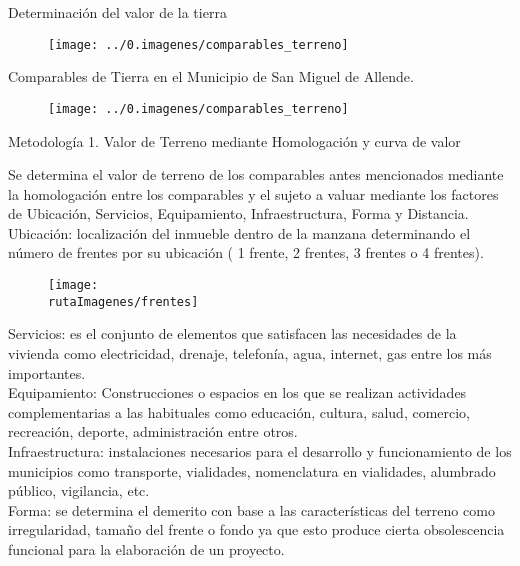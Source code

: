 \textcolor{principal}{Determinaci\'on del valor de la tierra}

\begin{figure}[H]
	\texttt{[image: ../0.imagenes/comparables\_terreno]}
\end{figure}

\textcolor{principal}{Comparables de Tierra en el Municipio de San Miguel de Allende.}

\begin{figure}[H]
	\texttt{[image: ../0.imagenes/comparables\_terreno]}
\end{figure}

\textcolor{principal}{Metodolog\'ia 1. Valor de Terreno mediante Homologaci\'on y curva de valor}

Se determina el valor de terreno de los comparables antes mencionados mediante la homologaci\'on entre los comparables y el sujeto a valuar mediante los factores de Ubicaci\'on, Servicios, Equipamiento, Infraestructura, Forma y Distancia.\\

Ubicaci\'on: localizaci\'on del inmueble dentro de la manzana determinando el n\'umero de frentes por su ubicaci\'on ( 1 frente, 2 frentes, 3 frentes o 4 frentes).

\begin{figure}[H]
	\texttt{[image: \\rutaImagenes/frentes]}
\end{figure}

\textcolor{principal}{Servicios:} es el conjunto de elementos que satisfacen las necesidades de  la vivienda  como electricidad, drenaje, telefon\'ia, agua, internet, gas entre los m\'as importantes.\\

\textcolor{principal}{Equipamiento}: Construcciones o espacios en los que se realizan actividades complementarias a las habituales como educaci\'on, cultura, salud, comercio, recreaci\'on, deporte, administraci\'on entre otros.\\

\textcolor{principal}{Infraestructura:} instalaciones necesarios para el desarrollo y funcionamiento de los municipios como transporte, vialidades, nomenclatura en  vialidades, alumbrado p\'ublico, vigilancia, etc.\\

\textcolor{principal}{Forma:}  se determina el dem\´erito con base a las caracter\'isticas del terreno como irregularidad, tama\~no del  frente o fondo ya que esto produce cierta obsolescencia funcional para la elaboraci\'on de un proyecto.\\

